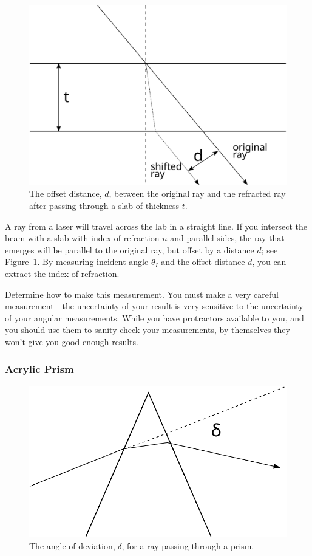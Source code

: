 \documentclass[12pt]{article}
\begin{document}
\begin{figure}
  \centering
  \includegraphics[width=\textwidth/2]{figures/slab}
  \caption{The offset distance, $d$, between the original ray and the
    refracted ray after passing through a slab of thickness $t$.}
  \label{fig:cube}
\end{figure}

A ray from a laser will travel across the lab in a straight line.  If
you intersect the beam with a slab with index of refraction $n$ and
parallel sides, the ray that emerges will be parallel to the original
ray, but offset by a distance $d$; see Figure~\ref{fig:cube}.  By
measuring incident angle $\theta_I$ and the offset distance $d$, you
can extract the index of refraction.

Determine how to make this measurement.  You must make a very careful
measurement - the uncertainty of your result is very sensitive to the
uncertainty of your angular measurements.  While you have protractors
available to you, and you should use them to sanity check your
measurements, by themselves they won't give you good enough results.

\subsubsection{Acrylic Prism}
\label{sec:prism}

\begin{figure}
  \centering
  \includegraphics[width=\textwidth/2]{figures/prism}
  \caption{The angle of deviation, $\delta$, for a ray passing through
  a prism.}
  \label{fig:prism}
\end{figure}
\end{document}
